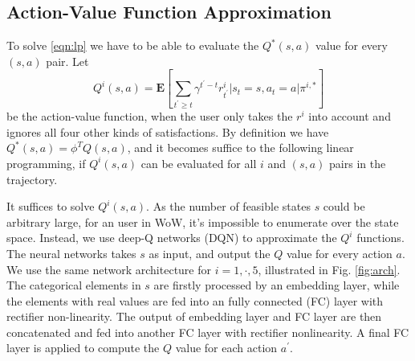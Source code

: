 \documentclass[a4paper]{article}
\begin{document}
\subsection{Action-Value Function Approximation}

To solve \ref{eqn:lp} we have to be able to evaluate the $Q^*(s,a)$ value for every $(s,a)$ pair. Let
$$Q^i(s,a)=\mathbf{E}[\sum_{t^\prime\geq t}\gamma^{t^\prime-t}r^i_{t^\prime} | s_{t}=s, a_{t}=a | \pi^{i,\ast}] \label{eqn:qi}$$
be the action-value function, when the user only takes the $r^i$ into account and ignores all four other kinds of satisfactions. By definition we have $Q^*(s,a)=\phi^TQ(s,a)$, and it becomes suffice to the following linear programming, if $Q^i(s,a)$ can be evaluated for all $i$ and $(s,a)$ pairs in the trajectory.

It suffices to solve $Q^i(s,a)$. As the number of feasible states $s$ could be arbitrary large, for an user in WoW, it's impossible to enumerate over the state space. Instead, we use deep-Q networks (DQN) \cite{} to approximate the $Q^i$ functions. The neural networks takes $s$ as input, and output the $Q$ value for every action $a$. We use the same network architecture for $i=1,\cdot,5$, illustrated in Fig. \ref{fig:arch}. The categorical elements in $s$ are firstly processed by an embedding layer, while the elements with real values are fed into an fully connected (FC) layer with rectifier non-linearity. The output of embedding layer and FC layer are then concatenated and fed into another FC layer with rectifier nonlinearity. A final FC layer is applied to compute the $Q$ value for each action $a^\prime$.
\end{document}
